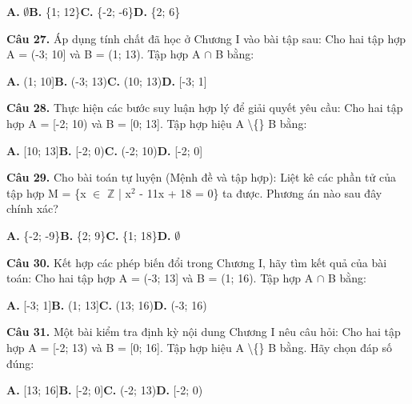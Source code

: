\documentclass[11pt,a4paper]{article}
\begin{document}
\hspace*{1.5em}\textbf{A.} $\emptyset$\quad\quad \textbf{B.} \{1; 12\}\quad\quad \textbf{C.} \{-2; -6\}\quad\quad \textbf{D.} \{2; 6\}\par\vspace{2pt}
\textbf{\color{primary} Câu 27.} Áp dụng tính chất đã học ở Chương I vào bài tập sau: Cho hai tập hợp A = (-3; 10] và B = (1; 13). Tập hợp A $\cap$ B bằng:\par
\hspace*{1.5em}\textbf{A.} (1; 10]\quad\quad \textbf{B.} (-3; 13)\quad\quad \textbf{C.} (10; 13)\quad\quad \textbf{D.} [-3; 1]\par\vspace{2pt}
\textbf{\color{primary} Câu 28.} Thực hiện các bước suy luận hợp lý để giải quyết yêu cầu: Cho hai tập hợp A = [-2; 10) và B = [0; 13]. Tập hợp hiệu A \textbackslash\{\} B bằng:\par
\hspace*{1.5em}\textbf{A.} [10; 13]\quad\quad \textbf{B.} [-2; 0)\quad\quad \textbf{C.} (-2; 10)\quad\quad \textbf{D.} [-2; 0]\par\vspace{2pt}
\textbf{\color{primary} Câu 29.} Cho bài toán tự luyện (Mệnh đề và tập hợp): Liệt kê các phần tử của tập hợp M = \{x $\in$ $\mathbb{Z}$ | x$^2$ - 11x + 18 = 0\} ta được. Phương án nào sau đây chính xác?\par
\hspace*{1.5em}\textbf{A.} \{-2; -9\}\quad\quad \textbf{B.} \{2; 9\}\quad\quad \textbf{C.} \{1; 18\}\quad\quad \textbf{D.} $\emptyset$\par\vspace{2pt}
\textbf{\color{primary} Câu 30.} Kết hợp các phép biến đổi trong Chương I, hãy tìm kết quả của bài toán: Cho hai tập hợp A = (-3; 13] và B = (1; 16). Tập hợp A $\cap$ B bằng:\par
\hspace*{1.5em}\textbf{A.} [-3; 1]\quad\quad \textbf{B.} (1; 13]\quad\quad \textbf{C.} (13; 16)\quad\quad \textbf{D.} (-3; 16)\par\vspace{2pt}
\textbf{\color{primary} Câu 31.} Một bài kiểm tra định kỳ nội dung Chương I nêu câu hỏi: Cho hai tập hợp A = [-2; 13) và B = [0; 16]. Tập hợp hiệu A \textbackslash\{\} B bằng. Hãy chọn đáp số đúng:\par
\hspace*{1.5em}\textbf{A.} [13; 16]\quad\quad \textbf{B.} [-2; 0]\quad\quad \textbf{C.} (-2; 13)\quad\quad \textbf{D.} [-2; 0)\par\vspace{2pt}
\end{document}
